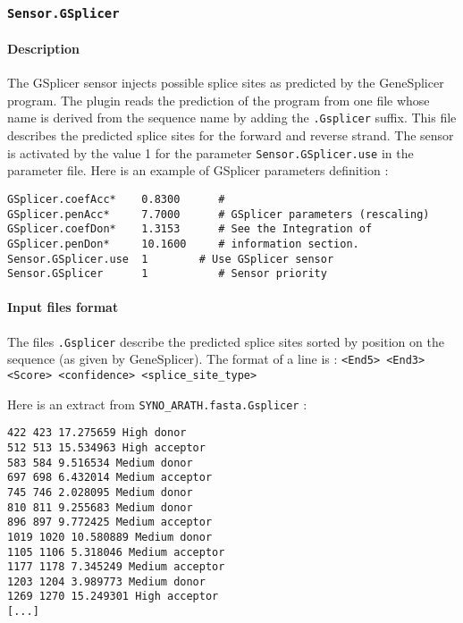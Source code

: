 
\subsubsection{\texttt{Sensor.GSplicer}}

\paragraph{Description}

The GSplicer sensor injects possible splice sites as predicted by the
GeneSplicer program. The plugin reads the prediction of the
program from one file whose name is derived from the sequence name by
adding the \texttt{.Gsplicer} suffix. This file describes the predicted
splice sites for the forward and reverse strand.  The sensor is
activated by the value 1 for the parameter
\texttt{Sensor.GSplicer.use} in the parameter file.  Here is an
example of GSplicer parameters definition :
\begin{Verbatim}[fontsize=\small]
GSplicer.coefAcc*    0.8300      #
GSplicer.penAcc*     7.7000      # GSplicer parameters (rescaling)
GSplicer.coefDon*    1.3153      # See the Integration of
GSplicer.penDon*     10.1600     # information section.
Sensor.GSplicer.use  1        # Use GSplicer sensor
Sensor.GSplicer      1           # Sensor priority
\end{Verbatim}

\paragraph{Input files format}

The files \texttt{.Gsplicer} describe the predicted splice sites
sorted by position on the sequence (as given by GeneSplicer).
The format of a line is : \texttt{<End5> <End3> <Score> <confidence>
  <splice\_site\_type>}

Here is an extract from \texttt{SYNO\_ARATH.fasta.Gsplicer} :
\begin{Verbatim}[fontsize=\small]
422 423 17.275659 High donor
512 513 15.534963 High acceptor
583 584 9.516534 Medium donor
697 698 6.432014 Medium acceptor
745 746 2.028095 Medium donor
810 811 9.255683 Medium donor
896 897 9.772425 Medium acceptor
1019 1020 10.580889 Medium donor
1105 1106 5.318046 Medium acceptor
1177 1178 7.345249 Medium acceptor
1203 1204 3.989773 Medium donor
1269 1270 15.249301 High acceptor
[...]
\end{Verbatim}

